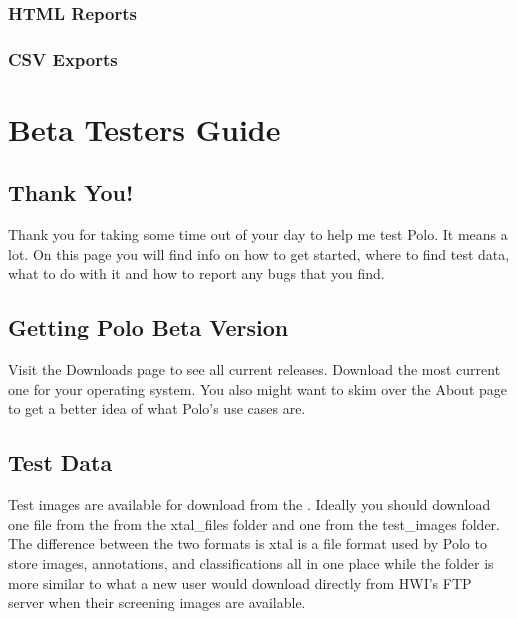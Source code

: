 \documentclass[letterpaper,10pt,english]{sphinxmanual}
\begin{document}
\subsection{HTML Reports}
\label{\detokenize{user_guide:html-reports}}

\subsection{CSV Exports}
\label{\detokenize{user_guide:csv-exports}}

\chapter{Beta Testers Guide}
\label{\detokenize{beta_testers:beta-testers-guide}}\label{\detokenize{beta_testers::doc}}

\section{Thank You!}
\label{\detokenize{beta_testers:thank-you}}
Thank you for taking some time out of your day to help me test Polo. It
means a lot. On this page you will find info on how to get started,
where to find test data, what to do with it and how to report any bugs that
you find.


\section{Getting Polo Beta Version}
\label{\detokenize{beta_testers:getting-polo-beta-version}}
Visit the Downloads page to see all current releases. Download the most
current one for your operating system. You also might want to skim over
the About page to get a better idea of what Polo’s use cases are.


\section{Test Data}
\label{\detokenize{beta_testers:test-data}}
Test images are available for download from the
.
Ideally you should download one file from the  from the xtal\_files folder
and one  from the test\_images folder. The difference between the two
formats is xtal is a file format used by Polo to store images, annotations,
and classifications all in one place while the folder is more similar to
what a new user would download directly from HWI’s FTP server when their
screening images are available.
\end{document}

